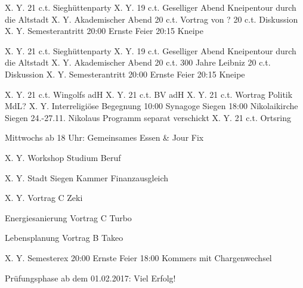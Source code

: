 %
% 

	
	\veranstaltungA
		{X. Y.} {21 c.t.} {}
		{Sieghüttenparty}
	\veranstaltungB
		{X. Y.} {19 c.t.} {}
		{Geselliger Abend} {Kneipentour durch die Altstadt}
	\veranstaltungC
		{X. Y.} {}
		{Akademischer Abend}
		{20 c.t.} {Vortrag von ?}
		{20 c.t.} {Diskussion}
	\veranstaltungC
		{X. Y.} {}
		{Semesterantritt}
		{20:00} {Ernste Feier}
		{20:15} {Kneipe}

		
	\veranstaltungA
		{X. Y.} {21 c.t.} {}
		{Sieghüttenparty}
	\veranstaltungB
		{X. Y.} {19 c.t.} {}
		{Geselliger Abend} {Kneipentour durch die Altstadt}
	\veranstaltungC
		{X. Y.} {}
		{Akademischer Abend}
		{20 c.t.} {300 Jahre Leibniz}
		{20 c.t.} {Diskussion}
	\veranstaltungC
		{X. Y.} {}
		{Semesterantritt}
		{20:00} {Ernste Feier}
		{20:15} {Kneipe}
		
	\veranstaltungA
		{X. Y.} {21 c.t.} {}
		{Wingolfs adH}
	\veranstaltungA
		{X. Y.} {21 c.t.} {}
		{BV adH}
	\veranstaltungA
		{X. Y.} {21 c.t.} {}
		{Wortrag Politik MdL?}
	\veranstaltungC
		{X. Y.} {}
		{Interreligiöse Begegnung}
		{10:00} {Synagoge Siegen}
		{18:00} {Nikolaikirche Siegen}
	\veranstaltungB
		{24.-}{27.11.}{}
		{Nikolaus} {Programm separat verschickt}
	\veranstaltungA
		{X. Y.} {21 c.t.} {}
		{Ortsring}
		
				
\neueAnkuendigung
		{Mittwochs ab 18 Uhr: Gemeinsames Essen \& Jour Fix}
		

	\veranstaltungA
		{X. Y.} {} {}
		{Workshop Studium Beruf}
		
	\veranstaltungA
		{X. Y.} {} {}
		{Stadt Siegen Kammer Finanzausgleich}

	\veranstaltungA
		{X. Y.} {} {}
		{Vortrag C Zeki}

	\veranstaltungA
		{Energiesanierung} {} {}
		{Vortrag C Turbo}

	\veranstaltungA
		{Lebensplanung} {} {}
		{Vortrag B Takeo}

	\veranstaltungC
		{X. Y.} {}
		{Semesterex}
		{20:00} {Ernste Feier}
		{18:00} {Kommers mit Chargenwechsel}

	\neueAnkuendigung
		{Prüfungsphase ab dem 01.02.2017: Viel Erfolg!}